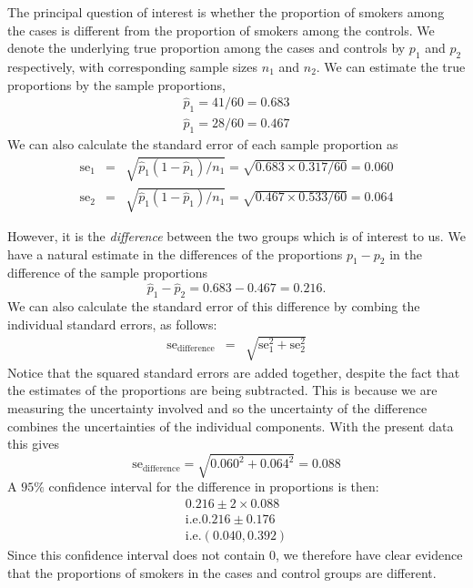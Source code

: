 \documentclass[
]{book}
\begin{document}
The principal question of interest is whether the proportion of smokers among the cases is different from the proportion of smokers among the controls.
We denote the underlying true proportion among the cases and controls by \(p_1\) and \(p_2\) respectively, with corresponding sample sizes \(n_1\) and \(n_2\). We can estimate the true proportions by the sample proportions,
\begin{eqnarray*}
        \hat{p}_1 = 41/60 = 0.683 \\
        \hat{p}_1 = 28/60 = 0.467
\end{eqnarray*}
We can also calculate the standard error of each sample proportion as
\begin{eqnarray*}
        \mbox{se}_1 & = & \sqrt{\hat{p}_1(1-\hat{p}_1)/n_1}
                      =  \sqrt{0.683 \times 0.317 / 60}
                      =  0.060 \\
        \mbox{se}_2 & = & \sqrt{\hat{p}_1(1-\hat{p}_1)/n_1}
                      =  \sqrt{0.467 \times 0.533 / 60}
                      =  0.064
\end{eqnarray*}

However, it is the \emph{difference} between the two groups which is of interest to us. We have a natural estimate in the differences of the proportions \(p_1-p_2\) in the difference of the sample proportions
\[
        \hat{p}_1 - \hat{p}_2  = 0.683 - 0.467 = 0.216 .
\]
We can also calculate the standard error of this difference by combing the individual standard errors, as follows:
\begin{eqnarray*}
        \mbox{se}_{\mbox{difference}} & = &
                \sqrt{\mbox{se}_1^2 + \mbox{se}_2^2}
\end{eqnarray*}
Notice that the squared standard errors are added together, despite the fact that the estimates of the proportions are being subtracted. This is because we are measuring the uncertainty involved and so the uncertainty of the difference combines the uncertainties of the individual components. With the present data this gives
\[
        \mbox{se}_{\mbox{difference}} = \sqrt{0.060^2 + 0.064^2}
                                = 0.088
\]
A \(95\%\) confidence interval for the difference in proportions is then:
\begin{eqnarray*}
        0.216 \pm 2 \times 0.088  \\
        \mbox{i.e.}  0.216 \pm 0.176 \\
        \mbox{i.e.}  (0.040, 0.392)
\end{eqnarray*}
Since this confidence interval does not contain \(0\), we therefore have
clear evidence that the proportions of smokers in the cases and control groups are different.
\end{document}
